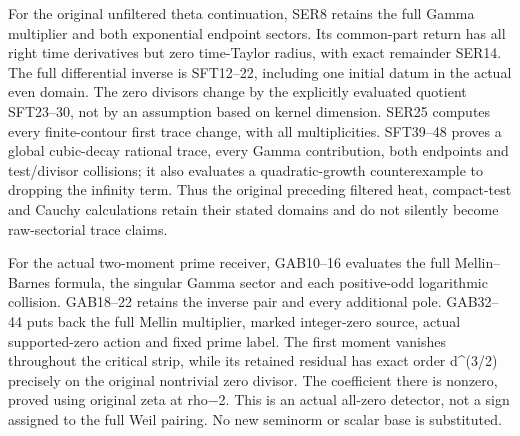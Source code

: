 \documentclass[
  10pt,
  a4paper,
]{article}
\begin{document}
For the original unfiltered theta continuation, SER8 retains the full
Gamma multiplier and both exponential endpoint sectors. Its common-part
return has all right time derivatives but zero time-Taylor radius, with
exact remainder SER14. The full differential inverse is SFT12--22,
including one initial datum in the actual even domain. The zero divisors
change by the explicitly evaluated quotient SFT23--30, not by an
assumption based on kernel dimension. SER25 computes every
finite-contour first trace change, with all multiplicities. SFT39--48
proves a global cubic-decay rational trace, every Gamma contribution,
both endpoints and test/divisor collisions; it also evaluates a
quadratic-growth counterexample to dropping the infinity term. Thus the
original preceding filtered heat, compact-test and Cauchy calculations
retain their stated domains and do not silently become raw-sectorial
trace claims.

For the actual two-moment prime receiver, GAB10--16 evaluates the full
Mellin--Barnes formula, the singular Gamma sector and each positive-odd
logarithmic collision. GAB18--22 retains the inverse pair and every
additional pole. GAB32--44 puts back the full Mellin multiplier, marked
integer-zero source, actual supported-zero action and fixed prime label.
The first moment vanishes throughout the critical strip, while its
retained residual has exact order d\^{}(3/2) precisely on the original
nontrivial zero divisor. The coefficient there is nonzero, proved using
original zeta at rho−2. This is an actual all-zero detector, not a sign
assigned to the full Weil pairing. No new seminorm or scalar base is
substituted.
\end{document}
